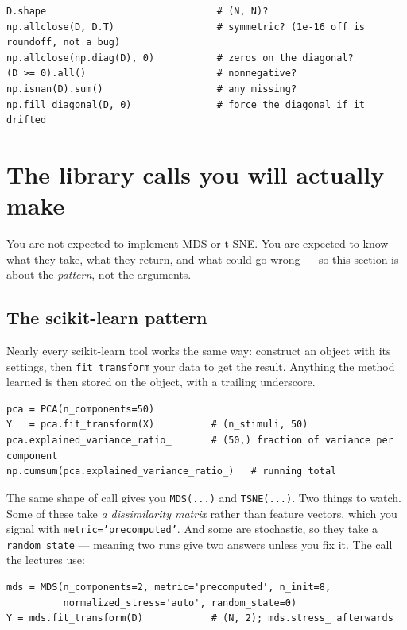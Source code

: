 \documentclass[11pt]{article}
\begin{document}
\begin{lstlisting}
D.shape                              # (N, N)?
np.allclose(D, D.T)                  # symmetric? (1e-16 off is roundoff, not a bug)
np.allclose(np.diag(D), 0)           # zeros on the diagonal?
(D >= 0).all()                       # nonnegative?
np.isnan(D).sum()                    # any missing?
np.fill_diagonal(D, 0)               # force the diagonal if it drifted
\end{lstlisting}

\section{The library calls you will actually make}

You are not expected to implement MDS or t-SNE. You are expected to know what
they take, what they return, and what could go wrong --- so this section is
about the \emph{pattern}, not the arguments.

\subsection{The scikit-learn pattern}

Nearly every scikit-learn tool works the same way: construct an object with its
settings, then \texttt{fit\_transform} your data to get the result. Anything
the method learned is then stored on the object, with a trailing underscore.

\begin{lstlisting}
pca = PCA(n_components=50)
Y   = pca.fit_transform(X)          # (n_stimuli, 50)
pca.explained_variance_ratio_       # (50,) fraction of variance per component
np.cumsum(pca.explained_variance_ratio_)   # running total
\end{lstlisting}

The same shape of call gives you \texttt{MDS(...)} and \texttt{TSNE(...)}. Two
things to watch. Some of these take \emph{a dissimilarity matrix} rather than
feature vectors, which you signal with \texttt{metric='precomputed'}. And some
are stochastic, so they take a \texttt{random\_state} --- meaning two runs give
two answers unless you fix it. The call the lectures use:

\begin{lstlisting}
mds = MDS(n_components=2, metric='precomputed', n_init=8,
          normalized_stress='auto', random_state=0)
Y = mds.fit_transform(D)            # (N, 2); mds.stress_ afterwards
\end{lstlisting}
\end{document}
